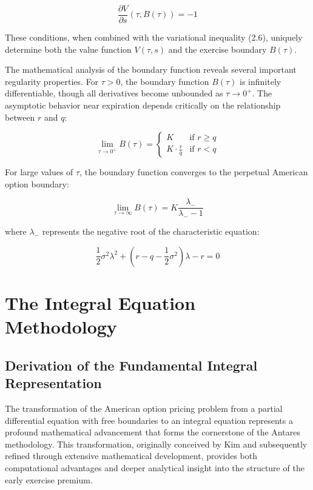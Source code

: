 \documentclass[
  american,
  11pt,
  11pt,
  letterpaper,
  onecolumn]{article}
\begin{document}
\[\frac{\partial V}{\partial s}(\tau, B(\tau)) = -1 \tag{2.10}\]

These conditions, when combined with the variational inequality (2.6),
uniquely determine both the value function \(V(\tau,s)\) and the
exercise boundary \(B(\tau)\).

The mathematical analysis of the boundary function reveals several
important regularity properties. For \(\tau > 0\), the boundary function
\(B(\tau)\) is infinitely differentiable, though all derivatives become
unbounded as \(\tau \to 0^+\). The asymptotic behavior near expiration
depends critically on the relationship between \(r\) and \(q\):

\[\lim_{\tau \to 0^+} B(\tau) = \begin{cases}
K & \text{if } r \geq q \\
K \cdot \frac{r}{q} & \text{if } r < q
\end{cases} \tag{2.11}\]

For large values of \(\tau\), the boundary function converges to the
perpetual American option boundary:

\[\lim_{\tau \to \infty} B(\tau) = K \frac{\lambda_-}{\lambda_- - 1} \tag{2.12}\]

where \(\lambda_-\) represents the negative root of the characteristic
equation:

\[\frac{1}{2}\sigma^2 \lambda^2 + \left(r-q-\frac{1}{2}\sigma^2\right)\lambda - r = 0 \tag{2.13}\]

\section{The Integral Equation
Methodology}\label{the-integral-equation-methodology}

\subsection{Derivation of the Fundamental Integral
Representation}\label{derivation-of-the-fundamental-integral-representation}

The transformation of the American option pricing problem from a partial
differential equation with free boundaries to an integral equation
represents a profound mathematical advancement that forms the
cornerstone of the Antares methodology. This transformation, originally
conceived by Kim and subsequently refined through extensive mathematical
development, provides both computational advantages and deeper
analytical insight into the structure of the early exercise premium.
\end{document}
